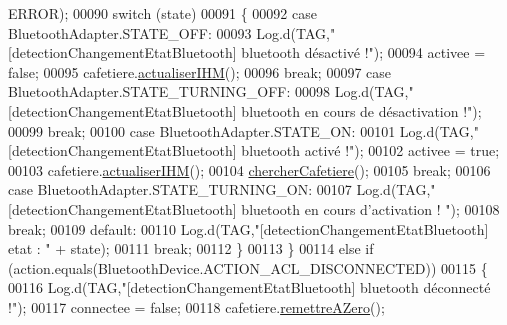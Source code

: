 \begin{DoxyCode}
      ERROR);
00090                     \textcolor{keywordflow}{switch} (state)
00091                     \{
00092                         \textcolor{keywordflow}{case} BluetoothAdapter.STATE\_OFF:
00093                             Log.d(TAG,\textcolor{stringliteral}{"[detectionChangementEtatBluetooth] bluetooth désactivé !"});
00094                             activee = \textcolor{keyword}{false};
00095                             cafetiere.\hyperlink{classcom_1_1example_1_1ekawa_1_1_cafetiere_ad8c8b7d410315f55a216de809571fd87}{actualiserIHM}();
00096                             \textcolor{keywordflow}{break};
00097                         \textcolor{keywordflow}{case} BluetoothAdapter.STATE\_TURNING\_OFF:
00098                             Log.d(TAG,\textcolor{stringliteral}{"[detectionChangementEtatBluetooth] bluetooth en cours de
       désactivation !"});
00099                             \textcolor{keywordflow}{break};
00100                         \textcolor{keywordflow}{case} BluetoothAdapter.STATE\_ON:
00101                             Log.d(TAG,\textcolor{stringliteral}{"[detectionChangementEtatBluetooth] bluetooth activé !"});
00102                             activee = \textcolor{keyword}{true};
00103                             cafetiere.\hyperlink{classcom_1_1example_1_1ekawa_1_1_cafetiere_ad8c8b7d410315f55a216de809571fd87}{actualiserIHM}();
00104                             \hyperlink{classcom_1_1example_1_1ekawa_1_1_communication_afc96e58f53fc167fe9fc76a229c01cb0}{chercherCafetiere}();
00105                             \textcolor{keywordflow}{break};
00106                         \textcolor{keywordflow}{case} BluetoothAdapter.STATE\_TURNING\_ON:
00107                             Log.d(TAG,\textcolor{stringliteral}{"[detectionChangementEtatBluetooth] bluetooth en cours d'activation !
      "});
00108                             \textcolor{keywordflow}{break};
00109                         \textcolor{keywordflow}{default}:
00110                             Log.d(TAG,\textcolor{stringliteral}{"[detectionChangementEtatBluetooth] etat : "} + state);
00111                             \textcolor{keywordflow}{break};
00112                     \}
00113                 \}
00114                 \textcolor{keywordflow}{else} \textcolor{keywordflow}{if} (action.equals(BluetoothDevice.ACTION\_ACL\_DISCONNECTED))
00115                 \{
00116                     Log.d(TAG,\textcolor{stringliteral}{"[detectionChangementEtatBluetooth] bluetooth déconnecté !"});
00117                     connectee = \textcolor{keyword}{false};
00118                     cafetiere.\hyperlink{classcom_1_1example_1_1ekawa_1_1_cafetiere_a10a040b45cfaac52cd5c26049bf2d7b7}{remettreAZero}();

\end{DoxyCode}
